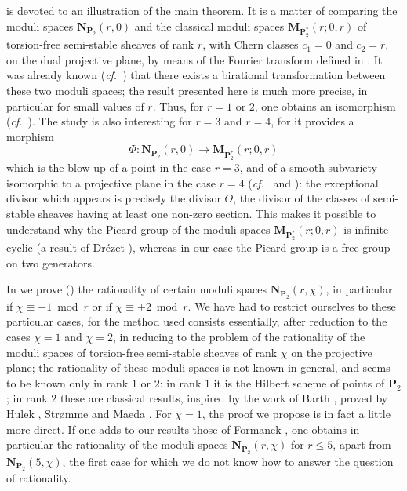 \documentclass[12pt,english]{smfart}%
\theoremstyle{plain}
\theoremstyle{definition}
\theoremstyle{remark}
\newcommand{\PP}{\mathbf{P}}
\newcommand{\Pd}{\PP_{2}^{*}}          %
\newcommand{\NN}{\mathbf{N}}           %
\newcommand{\MM}{\mathbf{M}}           %
\newcommand{\origpage}[1]{\marginnote{\scriptsize\itshape p.~#1}}
\begin{document}
 is devoted to an illustration of the main theorem. It is a matter of comparing the moduli spaces $\NN_{\PP_{2}}(r,0)$ and the classical moduli spaces $\MM_{\Pd}(r;0,r)$ of torsion-free semi-stable sheaves of rank $r$, with Chern classes $c_{1}=0$ and $c_{2}=r$, on the dual projective plane, by means of the Fourier transform defined in . It was already known (\emph{cf.}\ \cite{Mar}) that there exists a birational transformation between these two moduli spaces; the result presented here is much more precise, in particular
\origpage{637}
for small values of $r$. Thus, for $r=1$ or $2$, one obtains an isomorphism (\emph{cf.}\ ). The study is also interesting for $r=3$ and $r=4$, for it provides a morphism
\[
\Phi : \NN_{\PP_{2}}(r,0) \longrightarrow \MM_{\Pd}(r;0,r)
\]
which is the blow-up of a point in the case $r=3$, and of a smooth subvariety isomorphic to a projective plane in the case $r=4$ (\emph{cf.}\  and ): the exceptional divisor which appears is precisely the divisor $\Theta$, the divisor of the classes of semi-stable sheaves having at least one non-zero section. This makes it possible to understand why the Picard group of the moduli spaces $\MM_{\Pd}(r;0,r)$ is infinite cyclic (a result of Dr\'ezet \cite{Dre1}), whereas in our case the Picard group is a free group on two generators.

In  we prove () the rationality of certain moduli spaces $\NN_{\PP_{2}}(r,\chi)$, in particular if $\chi\equiv\pm 1\bmod r$ or if $\chi\equiv\pm 2\bmod r$. We have had to restrict ourselves to these particular cases, for the method used consists essentially, after reduction to the cases $\chi=1$ and $\chi=2$, in reducing to the problem of the rationality of the moduli spaces of torsion-free semi-stable sheaves of rank $\chi$ on the projective plane; the rationality of these moduli spaces is not known in general, and seems to be known only in rank $1$ or $2$: in rank $1$ it is the Hilbert scheme of points of $\PP_{2}$; in rank $2$ these are classical results, inspired by the work of Barth \cite{Bar}, proved by Hulek \cite{Hul}, Str\o mme \cite{Str} and Maeda \cite{Mae}. For $\chi=1$, the proof we propose is in fact a little more direct. If one adds to our results those of Formanek \cite{For}, one obtains in particular the rationality of the moduli spaces $\NN_{\PP_{2}}(r,\chi)$ for $r\leq 5$, apart from $\NN_{\PP_{2}}(5,\chi)$, the first case for which we do not know how to answer the question of rationality.
\end{document}
